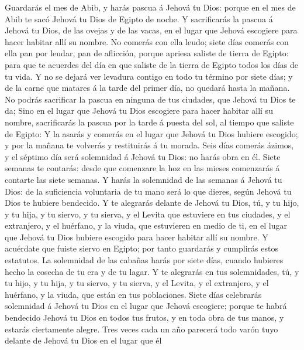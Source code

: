  Guardarás el mes de Abib, y harás pascua á Jehová tu
Dios: porque en el mes de Abib te sacó Jehová tu Dios de Egipto de
noche.  Y sacrificarás la pascua á Jehová tu Dios, de las
ovejas y de las vacas, en el lugar que Jehová escogiere para hacer
habitar allí su nombre.  No comerás con ella leudo; siete
días comerás con ella pan por leudar, pan de aflicción, porque apriesa
saliste de tierra de Egipto: para que te acuerdes del día en que saliste
de la tierra de Egipto todos los días de tu vida.  Y no se
dejará ver levadura contigo en todo tu término por siete días; y de la
carne que matares á la tarde del primer día, no quedará hasta la mañana.
 No podrás sacrificar la pascua en ninguna de tus
ciudades, que Jehová tu Dios te da;  Sino en el lugar que
Jehová tu Dios escogiere para hacer habitar allí su nombre, sacrificarás
la pascua por la tarde á puesta del sol, al tiempo que saliste de
Egipto:  Y la asarás y comerás en el lugar que Jehová tu
Dios hubiere escogido; y por la mañana te volverás y restituirás á tu
morada.  Seis días comerás ázimos, y el séptimo día será
solemnidad á Jehová tu Dios: no harás obra en él.  Siete
semanas te contarás: desde que comenzare la hoz en las mieses comenzarás
á contarte las siete semanas.  Y harás la solemnidad de
las semanas á Jehová tu Dios: de la suficiencia voluntaria de tu mano
será lo que dieres, según Jehová tu Dios te hubiere bendecido.
 Y te alegrarás delante de Jehová tu Dios, tú, y tu hijo,
y tu hija, y tu siervo, y tu sierva, y el Levita que estuviere en tus
ciudades, y el extranjero, y el huérfano, y la viuda, que estuvieren en
medio de ti, en el lugar que Jehová tu Dios hubiere escogido para hacer
habitar allí su nombre.  Y acuérdate que fuiste siervo en
Egipto; por tanto guardarás y cumplirás estos estatutos. 
La solemnidad de las cabañas harás por siete días, cuando hubieres hecho
la cosecha de tu era y de tu lagar.  Y te alegrarás en
tus solemnidades, tú, y tu hijo, y tu hija, y tu siervo, y tu sierva, y
el Levita, y el extranjero, y el huérfano, y la viuda, que están en tus
poblaciones.  Siete días celebrarás solemnidad á Jehová
tu Dios en el lugar que Jehová escogiere; porque te habrá bendecido
Jehová tu Dios en todos tus frutos, y en toda obra de tus manos, y
estarás ciertamente alegre.  Tres veces cada un año
parecerá todo varón tuyo delante de Jehová tu Dios en el lugar que él
